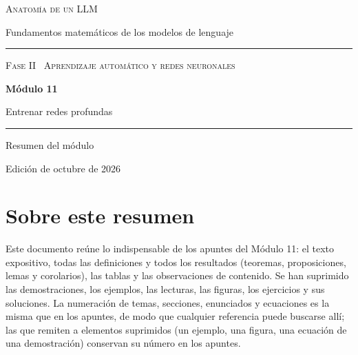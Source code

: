 \documentclass[11pt,a4paper,twoside,openany]{book}
\begin{document}
\frontmatter
\begin{titlepage}
\centering
\vspace*{2.5cm}
{\large\scshape Anatomía de un LLM}\par
\vspace{0.4cm}
{\normalsize Fundamentos matemáticos de los modelos de lenguaje}\par
\vspace{2.2cm}
\rule{\textwidth}{0.8pt}\par\vspace{0.5cm}
{\small\scshape Fase II \textperiodcentered\ Aprendizaje automático y redes neuronales}\par\vspace{0.3cm}
{\Huge\bfseries Módulo 11\par}\vspace{0.3cm}
{\LARGE Entrenar redes profundas\par}
\vspace{0.5cm}\rule{\textwidth}{0.4pt}\par
\vspace{1.6cm}
{\large Resumen del módulo}\par
\vfill
{\small Edición de octubre de 2026}\par
\end{titlepage}

\chapter*{Sobre este resumen}

Este documento reúne lo indispensable de los apuntes del Módulo 11: el texto expositivo, todas las definiciones y todos los resultados (teoremas, proposiciones, lemas y corolarios), las tablas y las observaciones de contenido. Se han suprimido las demostraciones, los ejemplos, las lecturas, las figuras, los ejercicios y sus soluciones. La numeración de temas, secciones, enunciados y ecuaciones es la misma que en los apuntes, de modo que cualquier referencia puede buscarse allí; las que remiten a elementos suprimidos (un ejemplo, una figura, una ecuación de una demostración) conservan su número en los apuntes.
\end{document}
